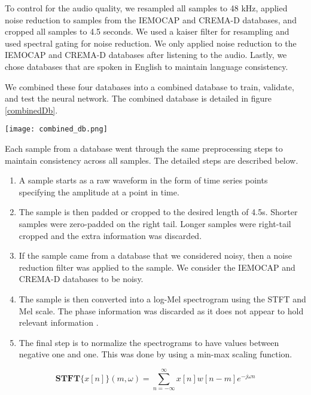 To control for the audio quality, we resampled all samples to 48 kHz, applied noise reduction to samples from the IEMOCAP and CREMA-D databases, and cropped all samples to 4.5 seconds. We used a kaiser filter for resampling and used spectral gating for noise reduction. We only applied noise reduction to the IEMOCAP and CREMA-D databases after listening to the audio. Lastly, we chose databases that are spoken in English to maintain language consistency.

We combined these four databases into a combined database to train, validate, and test the neural network. The combined database is detailed in figure \ref{combinedDb}.

\begin{figure*}
	\centering
	\hspace{6mm}
	\texttt{[image: combined\_db.png]} 
	\caption{Proportions of each database, emotion, and label types in the combined database.}
	\label{combinedDb}
\end{figure*}

Each sample from a database went through the same preprocessing steps to maintain consistency across all samples. The detailed steps are described below.
\begin{enumerate}
	\item A sample starts as a raw waveform in the form of time series points specifying the amplitude at a point in time.
	\item The sample is then padded or cropped to the desired length of 4.5s. Shorter samples were zero-padded on the right tail. Longer samples were right-tail cropped and the extra information was discarded.
	\item If the sample came from a database that we considered noisy, then a noise reduction filter was applied to the sample. We consider the IEMOCAP and CREMA-D databases to be noisy.
	\item The sample is then converted into a log-Mel spectrogram using the STFT and Mel scale. The phase information was discarded as it does not appear to hold relevant information \cite{Kozakowski2017}.
	\item The final step is to normalize the spectrograms to have values between negative one and one. This was done by using a min-max scaling function.
\end{enumerate}

\begin{equation}
\label{stft}
\mathbf{STFT}\{x[n]\}(m,\omega) = \sum_{n=-\infty}^{\infty}x[n]w[n-m]e^{-j \omega n}
\end{equation}


